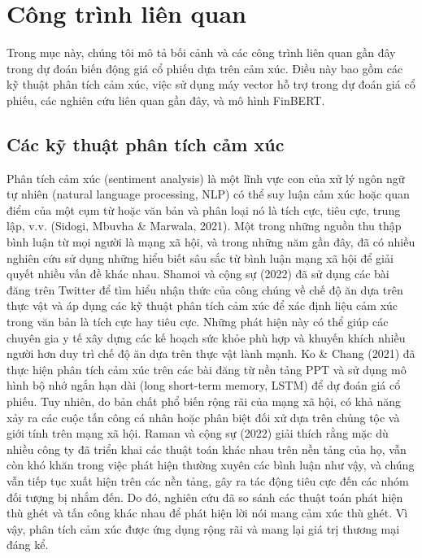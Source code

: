 \section{Công trình liên quan}

Trong mục này, chúng tôi mô tả bối cảnh và các công trình liên quan gần đây trong dự đoán biến động giá cổ phiếu dựa trên cảm xúc. Điều này bao gồm các kỹ thuật phân tích cảm xúc, việc sử dụng máy vector hỗ trợ trong dự đoán giá cổ phiếu, các nghiên cứu liên quan gần đây, và mô hình FinBERT.

\subsection*{Các kỹ thuật phân tích cảm xúc}

Phân tích cảm xúc (sentiment analysis) là một lĩnh vực con của xử lý ngôn ngữ tự nhiên (natural language processing, NLP) có thể suy luận cảm xúc hoặc quan điểm của một cụm từ hoặc văn bản và phân loại nó là tích cực, tiêu cực, trung lập, v.v. (Sidogi, Mbuvha \& Marwala, 2021). Một trong những nguồn thu thập bình luận từ mọi người là mạng xã hội, và trong những năm gần đây, đã có nhiều nghiên cứu sử dụng những hiểu biết sâu sắc từ bình luận mạng xã hội để giải quyết nhiều vấn đề khác nhau. Shamoi và cộng sự (2022) đã sử dụng các bài đăng trên Twitter để tìm hiểu nhận thức của công chúng về chế độ ăn dựa trên thực vật và áp dụng các kỹ thuật phân tích cảm xúc để xác định liệu cảm xúc trong văn bản là tích cực hay tiêu cực. Những phát hiện này có thể giúp các chuyên gia y tế xây dựng các kế hoạch sức khỏe phù hợp và khuyến khích nhiều người hơn duy trì chế độ ăn dựa trên thực vật lành mạnh. Ko \& Chang (2021) đã thực hiện phân tích cảm xúc trên các bài đăng từ nền tảng PPT và sử dụng mô hình bộ nhớ ngắn hạn dài (long short-term memory, LSTM) để dự đoán giá cổ phiếu. Tuy nhiên, do bản chất phổ biến rộng rãi của mạng xã hội, có khả năng xảy ra các cuộc tấn công cá nhân hoặc phân biệt đối xử dựa trên chủng tộc và giới tính trên mạng xã hội. Raman và cộng sự (2022) giải thích rằng mặc dù nhiều công ty đã triển khai các thuật toán khác nhau trên nền tảng của họ, vẫn còn khó khăn trong việc phát hiện thường xuyên các bình luận như vậy, và chúng vẫn tiếp tục xuất hiện trên các nền tảng, gây ra tác động tiêu cực đến các nhóm đối tượng bị nhắm đến. Do đó, nghiên cứu đã so sánh các thuật toán phát hiện thù ghét và tấn công khác nhau để phát hiện lời nói mang cảm xúc thù ghét. Vì vậy, phân tích cảm xúc được ứng dụng rộng rãi và mang lại giá trị thương mại đáng kể.

